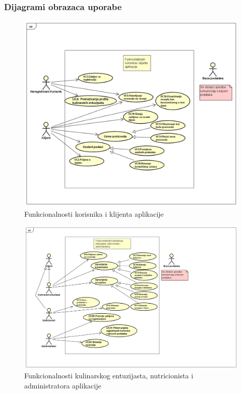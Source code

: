 					
									
				\subsubsection{Dijagrami obrazaca uporabe}
					
				\begin{figure}[H]
			\includegraphics[scale=0.4]{dijagrami/UML_Korisnik_Klijent.png} %
			\centering
			\caption{Funkcionalnosti korisnika i klijenta aplikacije}
			\label{UML1}
		\end{figure}
		
		
				\begin{figure}[H]
			\includegraphics[scale=0.4]{dijagrami/UML_KulinarskiEntuzijast_Nutricionist_Admin.png} %
			\centering
			\caption{Funkcionalnosti kulinarskog entuzijasta, nutricionista i administratora aplikacije}
			\label{UML2}
		\end{figure}
				
